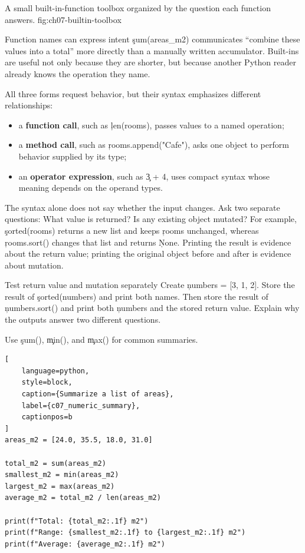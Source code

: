 {A small built-in-function toolbox organized by the question each function answers.}
{fig:ch07-builtin-toolbox}

\begin{ExplainBox}{Function names can express intent}
\c{sum(areas_m2)} communicates ``combine these values into a total'' more
directly than a manually written accumulator. Built-ins are useful not only
because they are shorter, but because another Python reader already knows the
operation they name.
\end{ExplainBox}


All three forms request behavior, but their syntax emphasizes different
relationships:
\begin{itemize}
    \item a \textbf{function call}, such as \c{len(rooms)}, passes values to a
          named operation;
    \item a \textbf{method call}, such as \c{rooms.append("Cafe")}, asks one
          object to perform behavior supplied by its type;
    \item an \textbf{operator expression}, such as \c{3 + 4}, uses compact
          syntax whose meaning depends on the operand types.
\end{itemize}

The syntax alone does not say whether the input changes. Ask two separate
questions: What value is returned? Is any existing object mutated? For example,
\c{sorted(rooms)} returns a new list and keeps \c{rooms} unchanged, whereas
\c{rooms.sort()} changes that list and returns \c{None}. Printing the result is
evidence about the return value; printing the original object before and after
is evidence about mutation.

\begin{TryBox}{Test return value and mutation separately}
Create \c{numbers = [3, 1, 2]}. Store the result of \c{sorted(numbers)} and
print both names. Then store the result of \c{numbers.sort()} and print both
\c{numbers} and the stored return value. Explain why the outputs answer two
different questions.
\end{TryBox}


Use \c{sum()}, \c{min()}, and \c{max()} for common summaries.

\begin{lstlisting}[
    language=python,
    style=block,
    caption={Summarize a list of areas},
    label={c07_numeric_summary},
    captionpos=b
]
areas_m2 = [24.0, 35.5, 18.0, 31.0]

total_m2 = sum(areas_m2)
smallest_m2 = min(areas_m2)
largest_m2 = max(areas_m2)
average_m2 = total_m2 / len(areas_m2)

print(f"Total: {total_m2:.1f} m2")
print(f"Range: {smallest_m2:.1f} to {largest_m2:.1f} m2")
print(f"Average: {average_m2:.1f} m2")
\end{lstlisting}

